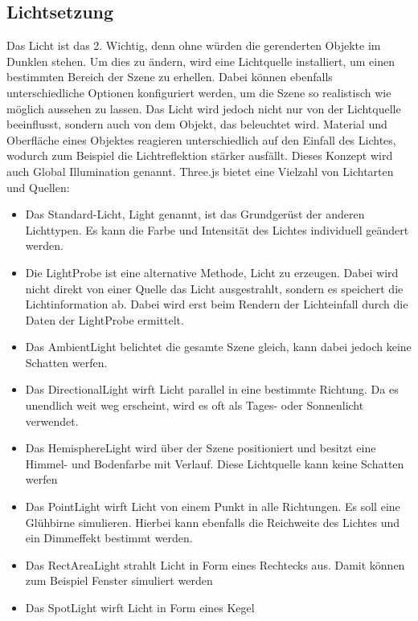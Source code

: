 \subsection{Lichtsetzung}
\label{lichtsetzung}
Das Licht ist das 2. Wichtig, denn ohne würden die gerenderten Objekte im Dunklen stehen. Um dies zu ändern, wird eine Lichtquelle installiert, um einen bestimmten Bereich der Szene zu erhellen. Dabei können ebenfalls unterschiedliche Optionen konfiguriert werden, um die Szene so realistisch wie möglich aussehen zu lassen. Das Licht wird jedoch nicht nur von der Lichtquelle beeinflusst, sondern auch von dem Objekt, das beleuchtet wird. Material und Oberfläche eines Objektes reagieren unterschiedlich auf den Einfall des Lichtes, wodurch zum Beispiel die Lichtreflektion stärker ausfällt. Dieses Konzept wird auch Global Illumination genannt. Three.js bietet eine Vielzahl von Lichtarten und Quellen:

\begin{itemize}
    \item Das Standard-Licht, Light genannt, ist das Grundgerüst der anderen Lichttypen. Es kann die Farbe und Intensität des Lichtes individuell geändert werden. \cite{StandardLight}
    \item Die LightProbe ist eine alternative Methode, Licht zu erzeugen. Dabei wird nicht direkt von einer Quelle das Licht ausgestrahlt, sondern es speichert die Lichtinformation ab. Dabei wird erst beim Rendern der Lichteinfall durch die Daten der LightProbe ermittelt.  \cite{LightProbe}
    \item Das AmbientLight belichtet die gesamte Szene gleich, kann dabei jedoch keine Schatten werfen. \cite{AmbientLight}
    \item Das DirectionalLight wirft Licht parallel in eine bestimmte Richtung. Da es unendlich weit weg erscheint, wird es oft als Tages- oder Sonnenlicht verwendet. \cite{DirectionalLight}
    \item Das HemisphereLight wird über der Szene positioniert und besitzt eine Himmel- und Bodenfarbe mit Verlauf. Diese Lichtquelle kann keine Schatten werfen \cite{HemisphereLight}
    \item Das PointLight wirft Licht von einem Punkt in alle Richtungen. Es soll eine Glühbirne simulieren. Hierbei kann ebenfalls die Reichweite des Lichtes und ein Dimmeffekt bestimmt werden. \cite{PointLight}
    \item Das RectAreaLight strahlt Licht in Form eines Rechtecks aus. Damit können zum Beispiel Fenster simuliert werden \cite{ReactAreaLight}
    \item Das SpotLight wirft Licht in Form eines Kegel \cite{SpotLight}
\end{itemize}

